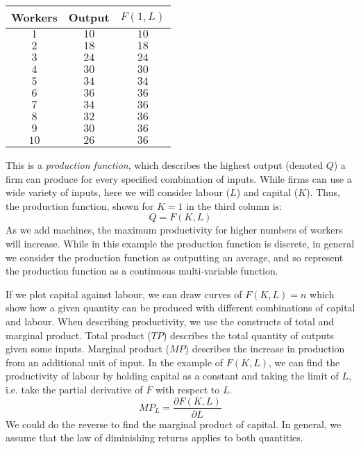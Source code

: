 \documentclass[12pt]{report}
\begin{document}
\begin{flushleft}
\begin{center}    
    \begin{tabular}{c|c|c}
        Workers & Output & \(F(1, L)\) \\
        \hline
        \(1\) & \(10\) & \(10\) \\
        \(2\) & \(18\) & \(18\) \\
        \(3\) & \(24\) & \(24\) \\
        \(4\) & \(30\) & \(30\) \\
        \(5\) & \(34\) & \(34\) \\
        \(6\) & \(36\) & \(36\) \\
        \(7\) & \(34\) & \(36\) \\
        \(8\) & \(32\) & \(36\) \\
        \(9\) & \(30\) & \(36\) \\
        \(10\) & \(26\) & \(36\) \\  
    \end{tabular}
\end{center}

This is a \textit{production function}, which describes the highest output
(denoted \(Q\)) a firm can produce for every specified combination of inputs.
While firms can use a wide variety of inputs, here we will consider labour 
(\(L\)) and capital (\(K\)). Thus, the production function, shown for \(K = 1\)
in the third column is:
\[Q = F(K, L)\]
As we add machines, the maximum productivity for higher numbers of workers will
increase. While in this example the production function is discrete, in general
we consider the production function as outputting an average, and so represent 
the production function as a continuous multi-variable function.

\bigskip
If we plot capital against labour, we can draw curves of \(F(K, L) = n\) which
show how a given quantity can be produced with different combinations of 
capital and labour. When describing productivity, we use the constructs of 
total and marginal product. Total product (\(TP\)) describes the total quantity
of outputs given some inputs. Marginal product (\(MP\)) describes the increase
in production from an additional unit of input. In the example of \(F(K, L)\),
we can find the productivity of labour by holding capital as a constant and 
taking the limit of \(L\), i.e. take the partial derivative of \(F\) with 
respect to \(L\).
\[MP_L = \frac{\partial F(K, L)}{\partial L}\]
We could do the reverse to find the marginal product of capital. In general,
we assume that the law of diminishing returns applies to both quantities.


\end{flushleft}
\end{document}
